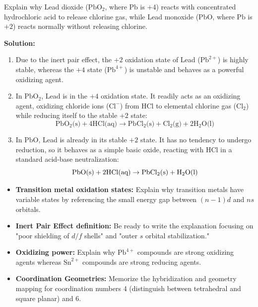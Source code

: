 \documentclass[12pt,a4paper]{article}
\begin{document}
\begin{tcolorbox}[examplebox, title={Example 6.1: Inert Pair Effect Oxidation Reaction}]
  Explain why Lead dioxide ($\text{PbO}_2$, where $\text{Pb}$ is $+4$) reacts with concentrated hydrochloric acid to release chlorine gas, while Lead monoxide ($\text{PbO}$, where $\text{Pb}$ is $+2$) reacts normally without releasing chlorine.
  \par\vspace{4pt}
  \textbf{Solution:}
  \begin{enumerate}
    \item Due to the inert pair effect, the $+2$ oxidation state of Lead ($\text{Pb}^{2+}$) is highly stable, whereas the $+4$ state ($\text{Pb}^{4+}$) is unstable and behaves as a powerful oxidizing agent.
    \item In $\text{PbO}_2$, Lead is in the $+4$ oxidation state. It readily acts as an oxidizing agent, oxidizing chloride ions ($\text{Cl}^-$) from $\text{HCl}$ to elemental chlorine gas ($\text{Cl}_2$) while reducing itself to the stable $+2$ state:
      \[ \text{PbO}_2\text{(s)} + 4\text{HCl(aq)} \to \text{PbCl}_2\text{(s)} + \text{Cl}_2\text{(g)} + 2\text{H}_2\text{O(l)} \]
    \item In $\text{PbO}$, Lead is already in its stable $+2$ state. It has no tendency to undergo reduction, so it behaves as a simple basic oxide, reacting with $\text{HCl}$ in a standard acid-base neutralization:
      \[ \text{PbO\text{(s)}} + 2\text{HCl(aq)} \to \text{PbCl}_2\text{(s)} + \text{H}_2\text{O(l)} \]
  \end{enumerate}
\end{tcolorbox}

\begin{tcolorbox}[exambox, title={Exam Points: Oxidation States and CN}]
  \begin{itemize}[leftmargin=*, itemsep=2pt, topsep=2pt]
    \item \textbf{Transition metal oxidation states:} Explain why transition metals have variable states by referencing the small energy gap between $(n-1)d$ and $ns$ orbitals.
    \item \textbf{Inert Pair Effect definition:} Be ready to write the explanation focusing on "poor shielding of $d/f$ shells" and "outer $s$ orbital stabilization."
    \item \textbf{Oxidizing power:} Explain why $\text{Pb}^{4+}$ compounds are strong oxidizing agents whereas $\text{Sn}^{2+}$ compounds are strong reducing agents.
    \item \textbf{Coordination Geometries:} Memorize the hybridization and geometry mapping for coordination numbers 4 (distinguish between tetrahedral and square planar) and 6.
  \end{itemize}
\end{tcolorbox}
\end{document}
